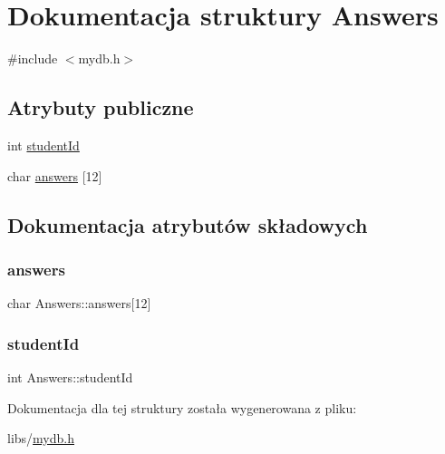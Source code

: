 \hypertarget{structAnswers}{}\section{Dokumentacja struktury Answers}
\label{structAnswers}


{\ttfamily \#include $<$mydb.\+h$>$}

\subsection*{Atrybuty publiczne}
\begin{DoxyCompactItemize}
\item 
int \mbox{\hyperlink{structAnswers_aa1103403098fae40f60afe3ea5e78396}{student\+Id}}
\item 
char \mbox{\hyperlink{structAnswers_a4157a86bf322214504cae9b9133865d6}{answers}} \mbox{[}12\mbox{]}
\end{DoxyCompactItemize}


\subsection{Dokumentacja atrybutów składowych}
\mbox{\label{structAnswers_a4157a86bf322214504cae9b9133865d6}} 
\subsubsection{\texorpdfstring{answers}{answers}}
{\footnotesize\ttfamily char Answers\+::answers\mbox{[}12\mbox{]}}

\mbox{\label{structAnswers_aa1103403098fae40f60afe3ea5e78396}} 
\subsubsection{\texorpdfstring{studentId}{studentId}}
{\footnotesize\ttfamily int Answers\+::student\+Id}



Dokumentacja dla tej struktury została wygenerowana z pliku\+:\begin{DoxyCompactItemize}
\item 
libs/\mbox{\hyperlink{mydb_8h}{mydb.\+h}}\end{DoxyCompactItemize}
